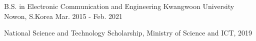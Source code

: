 

\begin{cventries}

  \cventry
    {B.S. in Electronic Communication and Engineering} %
    {Kwangwoon University} %
    {Nowon, S.Korea} %
    {Mar. 2015 - Feb. 2021} %
    {
      \begin{cvitems} %
        \item {National Science and Technology Scholarship, Ministry of Science and ICT, 2019}
      \end{cvitems}
    }

\end{cventries}
